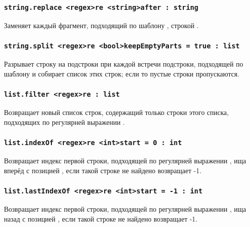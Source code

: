 \subsubsection{\lstinline|string.replace <regex>re <string>after : string|}

Заменяет каждый фрагмент, подходящий по шаблону , строкой .

\subsubsection{\lstinline|string.split <regex>re <bool>keepEmptyParts = true : list|}

Разрывает строку на подстроки при каждой встречи подстроки, подходящей по шаблону  и собирает список этих строк; если  то пустые строки пропускаются.

\subsubsection{\lstinline|list.filter <regex>re : list|}

Возвращает новый список строк, содержащий только строки этого списка, подходящих по регулярней выражении .

\subsubsection{\lstinline|list.indexOf <regex>re <int>start = 0 : int|}

Возвращает индекс первой строки, подходящей по регулярней выражении , ища вперёд с позицией , если такой строке не найдено возвращает -1.

\subsubsection{\lstinline|list.lastIndexOf <regex>re <int>start = -1 : int|}

Возвращает индекс первой строки, подходящей по регулярней выражении , ища назад с позицией , если такой строке не найдено возвращает -1.



